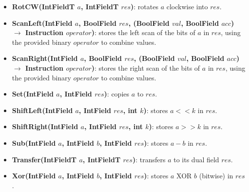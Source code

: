 \documentclass[11pt,a4paper]{report}
\begin{document}
\begin{itemize}
    \item \textbf{RotCW(IntFieldT $a$, IntFieldT $res$)}: rotates $a$ clockwise into $res$.
    \item \textbf{ScanLeft(IntField $a$, BoolField $res$, (BoolField $val$, BoolField $acc$) $\rightarrow$ Instruction $operator$)}: stores the left scan of the bits of $a$ in $res$, using the provided binary $operator$ to combine values.
    \item \textbf{ScanRight(IntField $a$, BoolField $res$, (BoolField $val$, BoolField $acc$) $\rightarrow$ Instruction $operator$)}: stores the right scan of the bits of $a$ in $res$, using the provided binary $operator$ to combine values.
    \item \textbf{Set(IntField $a$, IntField $res$)}: copies $a$ to $res$.
    \item \textbf{ShiftLeft(IntField $a$, IntField $res$, int $k$)}: stores $a << k$ in $res$.
    \item \textbf{ShiftRight(IntField $a$, IntField $res$, int $k$)}: stores $a >> k$ in $res$.
    \item \textbf{Sub(IntField $a$, IntField $b$, IntField $res$)}: stores $a - b$ in $res$.
    \item \textbf{Transfer(IntFieldT $a$, IntFieldT $res$)}: transfers $a$ to its dual field $res$.
    \item \textbf{Xor(IntField $a$, IntField $b$, IntField $res$)}: stores $a$ XOR $b$ (bitwise) in $res$.
\end{itemize}
\end{document}
